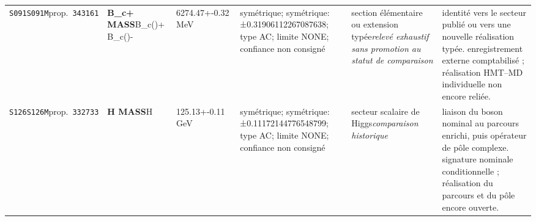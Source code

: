 \begin{landscape}
\begin{longtable}{L{1.85cm}L{4.45cm}L{2.35cm}L{4.05cm}L{3.35cm}L{7.15cm}}
\texttt{S091}\newline \texttt{S091M}\newline prop.\ \texttt{343161} & \textbf{B\_\allowbreak{}c+ MASS}\newline B\_\allowbreak{}c()+ \textbar{}\allowbreak{} B\_\allowbreak{}c()- & 6274.47+-0.32\,MeV & symétrique; symétrique: ±0.31906112267087638; type AC; limite NONE; confiance non consigné & section élémentaire ou extension typée\newline \emph{relevé exhaustif sans promotion au statut de comparaison} & identité vers le secteur publié ou vers une nouvelle réalisation typée. enregistrement externe comptabilisé ; réalisation HMT--MD individuelle non encore reliée. \\
\texttt{S126}\newline \texttt{S126M}\newline prop.\ \texttt{332733} & \textbf{H MASS}\newline H & 125.13+-0.11\,GeV & symétrique; symétrique: ±0.11172144776548799; type AC; limite NONE; confiance non consigné & secteur scalaire de Higgs\newline \emph{comparaison historique} & liaison du boson nominal au parcours enrichi, puis opérateur de pôle complexe. signature nominale conditionnelle ; réalisation du parcours et du pôle encore ouverte. \\
\end{longtable}
\endgroup
\end{landscape}
\clearpage
